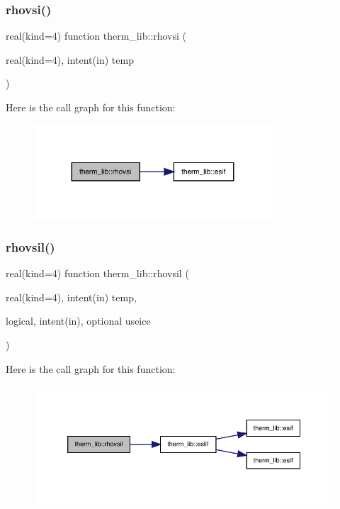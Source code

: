 \subsubsection{\texorpdfstring{rhovsi()}{rhovsi()}}
{\footnotesize\ttfamily real(kind=4) function therm\+\_\+lib\+::rhovsi (\begin{DoxyParamCaption}\item[{real(kind=4), intent(in)}]{temp }\end{DoxyParamCaption})}

Here is the call graph for this function\+:
\nopagebreak
\begin{figure}[H]
\begin{center}
\leavevmode
\includegraphics[width=251pt]{namespacetherm__lib_a1fbd9c44eee7d212c59b884df5f03718_cgraph}
\end{center}
\end{figure}
\mbox{\label{namespacetherm__lib_a981917e8b19e34bc9f094d6aa4416c26}} 
\subsubsection{\texorpdfstring{rhovsil()}{rhovsil()}}
{\footnotesize\ttfamily real(kind=4) function therm\+\_\+lib\+::rhovsil (\begin{DoxyParamCaption}\item[{real(kind=4), intent(in)}]{temp,  }\item[{logical, intent(in), optional}]{useice }\end{DoxyParamCaption})}

Here is the call graph for this function\+:
\nopagebreak
\begin{figure}[H]
\begin{center}
\leavevmode
\includegraphics[width=350pt]{namespacetherm__lib_a981917e8b19e34bc9f094d6aa4416c26_cgraph}
\end{center}
\end{figure}
\mbox{\label{namespacetherm__lib_a0d35dbf53cc9ae9c3f1b5a5d21126bd8}} 

